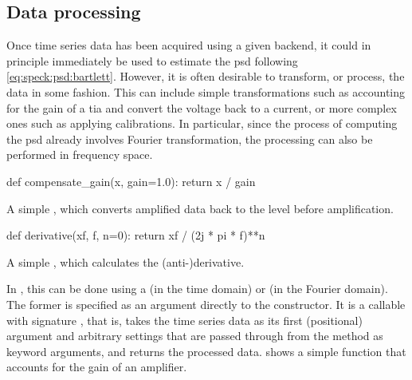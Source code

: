 \subsection{Data processing}\label{subsec:speck:software:design:processing}
Once time series data has been acquired using a given  backend, it could in principle immediately be used to estimate the \gls{psd} following \cref{eq:speck:psd:bartlett}.
However, it is often desirable to transform, or process, the data in some fashion.
This can include simple transformations such as accounting for the gain of a \gls{tia} and convert the voltage back to a current,
or more complex ones such as applying calibrations.
In particular, since the process of computing the \gls{psd} already involves Fourier transformation, the processing can also be performed in frequency space.

\begin{marginlisting}
    \begin{py}[fontsize=\footnotesize]
        def compensate_gain(x, gain=1.0):
            return x / gain
    \end{py}
    \caption[Simple  example]{A simple , which converts amplified data back to the level before amplification.}
    \label{lst:speck:procfn}
\end{marginlisting}
\begin{marginlisting}
    \begin{py}[fontsize=\footnotesize]
        def derivative(xf, f, n=0):
            return xf / (2j * pi * f)**n
    \end{py}
    \caption[Simple  example]{A simple , which calculates the \mbox{(anti-)}derivative.}
    \label{lst:speck:fourier_procfn}
\end{marginlisting}

In \pyspeck, this can be done using a  (in the time domain) or  (in the Fourier domain).
The former is specified as an argument directly to the  constructor.
It is a callable with signature , that is, takes the time series data as its first (positional) argument and arbitrary settings that are passed through from the  method as keyword arguments, and returns the processed data.
 shows a simple function that accounts for the gain of an amplifier.

